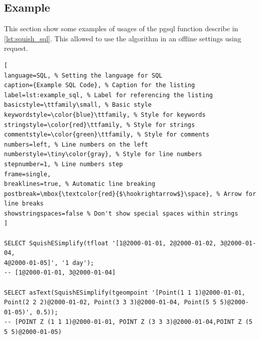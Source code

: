 \subsection{Example}
This section show some examples of usages of the pgsql function describe in \ref{lst:squish_sql}. This allowed to use the algorithm in an offline settings using request.\\


\begin{minipage}{\linewidth}
\begin{lstlisting}[
language=SQL, % Setting the language for SQL
caption={Example SQL Code}, % Caption for the listing
label=lst:example_sql, % Label for referencing the listing
basicstyle=\ttfamily\small, % Basic style
keywordstyle=\color{blue}\ttfamily, % Style for keywords
stringstyle=\color{red}\ttfamily, % Style for strings
commentstyle=\color{green}\ttfamily, % Style for comments
numbers=left, % Line numbers on the left
numberstyle=\tiny\color{gray}, % Style for line numbers
stepnumber=1, % Line numbers step
frame=single,
breaklines=true, % Automatic line breaking
postbreak=\mbox{\textcolor{red}{$\hookrightarrow$}\space}, % Arrow for line breaks
showstringspaces=false % Don't show special spaces within strings
]

SELECT SquishESimplify(tfloat '[1@2000-01-01, 2@2000-01-02, 3@2000-01-04,
4@2000-01-05]', '1 day');
-- [1@2000-01-01, 3@2000-01-04]

SELECT asText(SquishESimplify(tgeompoint '[Point(1 1 1)@2000-01-01,
Point(2 2 2)@2000-01-02, Point(3 3 3)@2000-01-04, Point(5 5 5)@2000-01-05)', 0.5));
-- [POINT Z (1 1 1)@2000-01-01, POINT Z (3 3 3)@2000-01-04,POINT Z (5 5 5)@2000-01-05)

\end{lstlisting}
\end{minipage}
